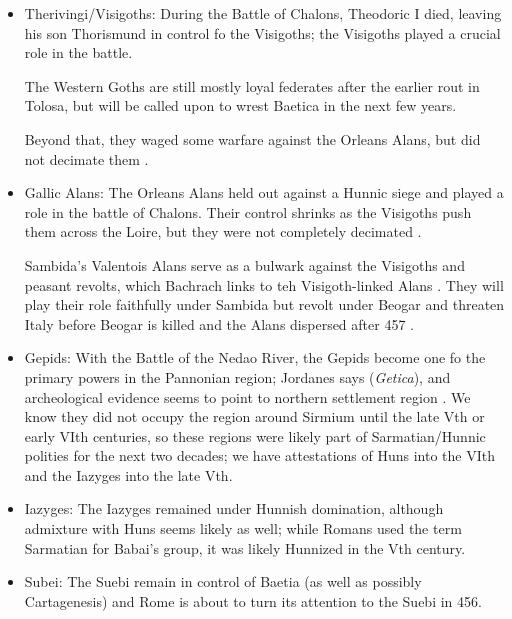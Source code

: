 \documentclass{article}
\begin{document}
\begin{itemize}
		\item Therivingi/Visigoths:\newline
		During the Battle of Chalons, Theodoric I died, leaving his son Thorismund in control fo the Visigoths; the Visigoths played a crucial role in the battle.
		
		The Western Goths are still mostly loyal federates after the earlier rout in Tolosa, but will be called upon to wrest Baetica in the next few years.
		
		Beyond that, they waged some warfare against the Orleans Alans, but did not decimate them \cite{BachrachAlans}.
		
		\item Gallic Alans:\newline
		The Orleans Alans held out against a Hunnic siege and played a role in the battle of Chalons.
		Their control shrinks as the Visigoths push them across the Loire, but they were not completely decimated \cite{BachrachAlans}.
		
		Sambida's Valentois Alans serve as a bulwark against the Visigoths and peasant revolts, which Bachrach links to teh Visigoth-linked Alans \cite{BachrachAlans}.
		They will play their role faithfully under Sambida but revolt under Beogar and threaten Italy before Beogar is killed and the Alans dispersed after 457 \cite{BachrachAlans}.
		
		\item Gepids:\newline
		With the Battle of the Nedao River, the Gepids become one fo the primary powers in the Pannonian region; Jordanes says (\textit{Getica}), and archeological evidence seems to point to northern settlement region \cite{GepidsInBalkans}.
		We know they did not occupy the region around Sirmium until the late Vth or early VIth centuries, so these regions were likely part of Sarmatian/Hunnic polities for the next two decades; we have attestations of Huns into the VIth and the Iazyges into the late Vth.
		
		\item Iazyges:\newline
		The Iazyges remained under Hunnish domination, although admixture with Huns seems likely as well; while Romans used the term Sarmatian for Babai's group, it was likely Hunnized in the Vth century.
		
		\item Subei:\newline
		The Suebi remain in control of Baetia (as well as possibly Cartagenesis) and Rome is about to turn its attention to the Suebi in 456.
		

\end{itemize}
\end{document}
